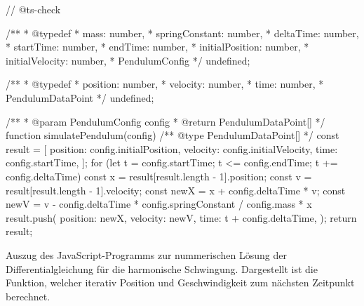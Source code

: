 \begin{listing}
\begin{jscode}
// @ts-check

/**
 * @typedef {{
 *   mass: number,
 *   springConstant: number,
 *   deltaTime: number,
 *   startTime:  number,
 *   endTime: number,
 *   initialPosition: number,
 *   initialVelocity: number,
 * }} PendulumConfig
 */
undefined;

/**
 * @typedef {{
 *   position: number,
 *   velocity: number,
 *   time: number,
 * }} PendulumDataPoint
 */
undefined;

/**
 * @param {PendulumConfig} config
 * @return {PendulumDataPoint[]}
 */
function simulatePendulum(config) {
    /** @type {PendulumDataPoint[]} */
    const result = [{
        position: config.initialPosition,
        velocity: config.initialVelocity,
        time: config.startTime,
    }];
    for (let t = config.startTime; t <= config.endTime; t += config.deltaTime) {
        const x = result[result.length - 1].position;
        const v = result[result.length - 1].velocity;
        const newX = x + config.deltaTime * v;
        const newV = v - config.deltaTime * config.springConstant / config.mass * x
        result.push({
            position: newX,
            velocity: newV,
            time: t + config.deltaTime,
        });
    }
    return result;
}
\end{jscode}
    \caption[Code Nummerische Lösung DGL]{Auszug des JavaScript-Programms zur nummerischen Lösung der Differentialgleichung für die harmonische Schwingung. Dargestellt ist die Funktion, welcher iterativ Position und Geschwindigkeit zum nächsten Zeitpunkt berechnet.}
    \label{lst:NumSolveCode}
\end{listing}